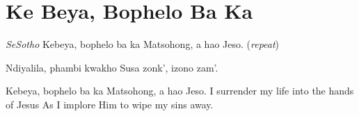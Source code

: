 \starttocol
\chapter{Ke Beya, Bophelo Ba Ka}
\nexttocol
\hfill{\it SeSotho}
\stoptocol
\starttocol
\startlines
K{\sc ebeya}, bophelo ba ka
Matsohong, a hao Jeso.    \hfill     ({\it repeat})~~~~~~~~~\hfill

Ndiyalila, phambi kwakho
Susa zonk', izono zam'.

Kebeya, bophelo ba ka
Matsohong, a hao Jeso.
\stoplines
\nexttocol
I surrender my life into the hands of Jesus
As I implore Him to wipe my sins away.
\stoptocol
